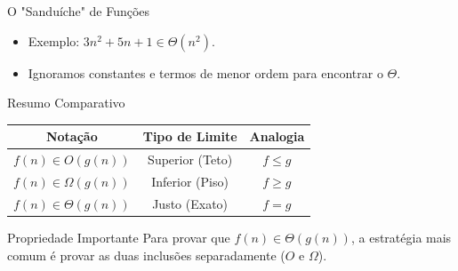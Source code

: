 \documentclass[aspectratio=169]{beamer}
\begin{document}
\begin{frame}{O "Sanduíche" de Funções}

\centering
{}
    \begin{itemize}
        \item Exemplo: $3n^2 + 5n + 1 \in \Theta(n^2)$.
        \item Ignoramos constantes e termos de menor ordem para encontrar o $\Theta$.
    \end{itemize}
\end{frame}

\begin{frame}{Resumo Comparativo}
    \centering
    \renewcommand{\arraystretch}{1.2}
    \begin{tabular}{|c|c|c|}
        \hline
        \textbf{Notação} & \textbf{Tipo de Limite} & \textbf{Analogia} \\ \hline
        $f(n) \in O(g(n))$ & Superior (Teto) & $f \le g$ \\ \hline
        $f(n) \in \Omega(g(n))$ & Inferior (Piso) & $f \ge g$ \\ \hline
        $f(n) \in \Theta(g(n))$ & Justo (Exato) & $f = g$ \\ \hline
    \end{tabular}

    \vspace{0.5cm}
    \begin{exampleblock}{Propriedade Importante}
        Para provar que $f(n) \in \Theta(g(n))$, a estratégia mais comum é provar as duas inclusões separadamente ($O$ e $\Omega$).
    \end{exampleblock}
\end{frame}
\end{document}
